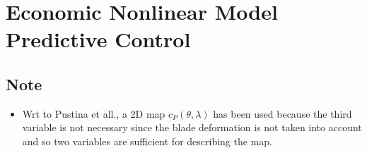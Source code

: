 \section{Economic Nonlinear Model Predictive Control}
\subsection{Note}
\begin{itemize}
  \item Wrt to Pustina et all., a 2D map $c_P(\theta, \lambda)$ has been used because the third variable is not necessary since the blade deformation is not taken into account and so two variables are sufficient for describing the map.
\end{itemize}